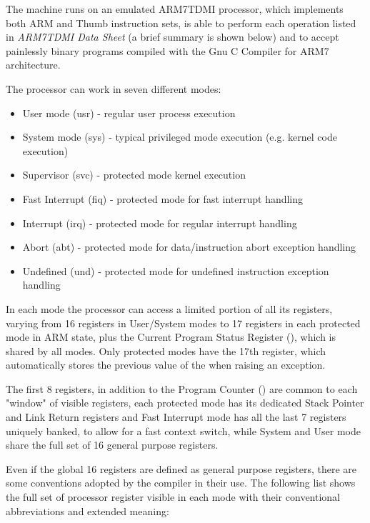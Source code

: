 The \uarm{} machine runs on an emulated ARM7TDMI processor, which implements both ARM and Thumb instruction sets, is able to perform each operation listed in \emph{ARM7TDMI Data Sheet} (a brief summary is shown below) and to accept painlessly binary programs compiled with the Gnu C Compiler for ARM7 architecture.

\label{sec:man:processorRegisters}
The processor can work in seven different modes:
\begin{itemize}
\item User mode (usr) - regular user process execution
\item System mode (sys) - typical privileged mode execution (e.g. kernel code execution)
\item Supervisor (svc) - protected mode kernel execution
\item Fast Interrupt (fiq) - protected mode for fast interrupt handling
\item Interrupt (irq) - protected mode for regular interrupt handling
\item Abort (abt) - protected mode for data/instruction abort exception handling
\item Undefined (und) - protected mode for undefined instruction exception handling
\end{itemize}

In each mode the processor can access a limited portion of all its registers, varying from 16 registers in User/System modes to 17 registers in each protected mode in ARM state, plus the Current Program Status Register (), which is shared by all modes.
Only protected modes have the 17th register, which automatically stores the previous value of the  when raising an exception.

The first 8 registers, in addition to the Program Counter () are common to each "window" of visible registers, each protected mode has its dedicated Stack Pointer and Link Return registers and Fast Interrupt mode has all the last 7 registers uniquely banked, to allow for a fast context switch, while System and User mode share the full set of 16 general purpose registers.


Even if the global 16 registers are defined as general purpose registers, there are some conventions adopted by the compiler in their use. The following list shows the full set of processor register visible in each mode with their conventional abbreviations and extended meaning:


